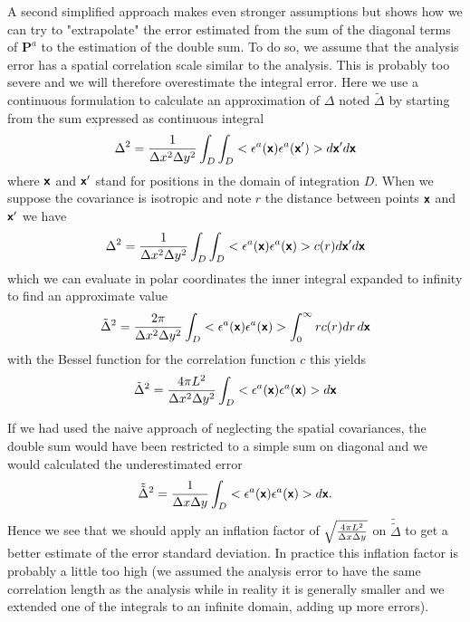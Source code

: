 A second simplified approach makes even stronger assumptions but shows how we can try to "extrapolate" the error estimated from the sum of the diagonal terms of $\mathbf{P}^a$ to the estimation of the double sum. To do so, we assume that the analysis error has a spatial correlation scale similar to the analysis.
This is probably too severe and we will therefore overestimate the integral error. 
Here we use a continuous formulation to calculate an approximation of $\Delta$ noted $\tilde{\Delta}$ by starting from the sum expressed as continuous integral
\begin{equation}
{\Delta}^2= {1 \over \Delta x^2 \Delta y^2} \int_D \int_D <{\epsilon}^a(\mbox{\boldmath $ \protect\mathsf{x} $}) {\epsilon}^a(\mbox{\boldmath $ \protect\mathsf{x} $}^\prime)> d \mbox{\boldmath $ \protect\mathsf{x} $}^\prime d \mbox{\boldmath $ \protect\mathsf{x} $} 
\end{equation}
where $\mbox{\boldmath $ \protect\mathsf{x} $}$ and $\mbox{\boldmath $ \protect\mathsf{x} $}^\prime$ stand for positions in the domain of integration $D$. When we suppose the covariance is isotropic and note $r$ the distance between points
$\mbox{\boldmath $ \protect\mathsf{x} $}$ and $\mbox{\boldmath $ \protect\mathsf{x} $}^\prime$ we have 
\begin{equation}
{\Delta}^2= {1 \over \Delta x^2 \Delta y^2} \int_D \int_D <{\epsilon}^a(\mbox{\boldmath $ \protect\mathsf{x} $}) {\epsilon}^a(\mbox{\boldmath $ \protect\mathsf{x} $}) > c(r) d \mbox{\boldmath $ \protect\mathsf{x} $}^\prime d \mbox{\boldmath $ \protect\mathsf{x} $}  
\end{equation}
which we can evaluate in polar coordinates the inner integral expanded to infinity to find an approximate value
\begin{equation}
\tilde{\Delta}^2= {2 \pi \over \Delta x^2 \Delta y^2} \int_D <{\epsilon}^a(\mbox{\boldmath $ \protect\mathsf{x} $}) {\epsilon}^a(\mbox{\boldmath $ \protect\mathsf{x} $}) > \int_0^{\infty}  r c(r) d r \, d \mbox{\boldmath $ \protect\mathsf{x} $}
\end{equation}
with the Bessel function for the correlation function $c$ this yields
\begin{equation}
\tilde{\Delta}^2= {4 \pi L^2 \over \Delta x^2 \Delta y^2} \int_D <{\epsilon}^a(\mbox{\boldmath $ \protect\mathsf{x} $}) {\epsilon}^a(\mbox{\boldmath $ \protect\mathsf{x} $}) >  d \mbox{\boldmath $ \protect\mathsf{x} $}
\end{equation}

If we had used the naive approach of neglecting the spatial covariances, the double sum would have been restricted to a simple sum on diagonal and we would calculated the underestimated error 
\begin{equation}
\tilde{\tilde{\Delta}}^2= {1 \over \Delta x \Delta y} \int_D <{\epsilon}^a(\mbox{\boldmath $ \protect\mathsf{x} $}) {\epsilon}^a(\mbox{\boldmath $ \protect\mathsf{x} $}) >  d \mbox{\boldmath $ \protect\mathsf{x} $}.
\end{equation}
Hence we see that we should apply an inflation factor of $\sqrt{{4 \pi L^2 \over \Delta x \Delta y}}$ on $\tilde{\tilde{\Delta}}$ to get a better estimate of the error standard deviation. In practice  this inflation factor is probably a little too high (we assumed the analysis error to have the same correlation length as the analysis while in reality it is generally smaller and we extended one of the integrals to an infinite domain, adding up more errors).




